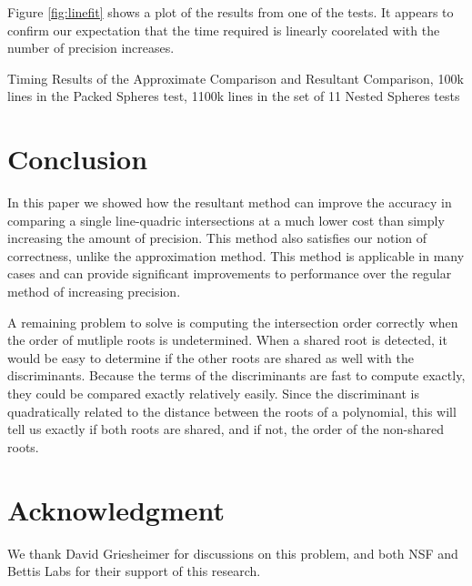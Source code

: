 \documentclass{cccg16}
\begin{document}
Figure \ref{fig:linefit} shows a plot of the results from one of the
tests.  It appears to confirm our expectation that the time required
is linearly coorelated with the number of precision increases.

\begin{table}
  \caption{Timing Results of the Approximate Comparison and Resultant
    Comparison, 100k lines in the Packed Spheres test, 1100k lines in
    the set of 11 Nested Spheres tests}
  \label{tab:times}
  
\end{table}

\section{Conclusion}
In this paper we showed how the resultant method can improve the
accuracy in comparing a single line-quadric intersections at a much
lower cost than simply increasing the amount of precision.  This
method also satisfies our notion of correctness, unlike the
approximation method.  This method is applicable in many cases and can
provide significant improvements to performance over the regular
method of increasing precision.

A remaining problem to solve is computing the intersection order
correctly when the order of mutliple roots is undetermined.  When a
shared root is detected, it would be easy to determine if the other
roots are shared as well with the discriminants.  Because the terms of
the discriminants are fast to compute exactly, they could be compared
exactly relatively easily.  Since the discriminant is quadratically
related to the distance between the roots of a polynomial, this will
tell us exactly if both roots are shared, and if not, the order of the
non-shared roots.

\section{Acknowledgment}
We thank David Griesheimer for discussions on this problem, and both
NSF and Bettis Labs for their support of this research.



\end{document}
